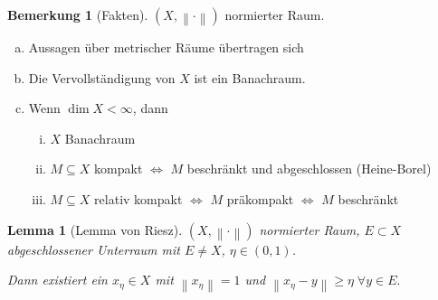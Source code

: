 \documentclass[ngerman]{report}
\theoremstyle{plain}%
\newtheorem{lemma}[thm]{Lemma}
\theoremstyle{definition}%
\theoremstyle{myStyle}
\newtheorem{bem}[thm]{Bemerkung}
\newcommand{\norm}[1]{\left \|#1\right\| }
\newcommand{\aq}{\Leftrightarrow} %
\begin{document}
	\begin{bem}[Fakten]
		$(X,\norm{\cdot})$ normierter Raum.
		\begin{enumerate}[a)]
			\item Aussagen über metrischer Räume übertragen sich
			\item Die Vervollständigung von $X$ ist ein Banachraum.
			\item Wenn $\dim X < \infty$, dann
				\begin{enumerate}[i)]
					\item $X$ Banachraum
					\item $M\subseteq X$ kompakt $\aq$ $M$ beschränkt und abgeschlossen (Heine-Borel)
					\item $M\subseteq X$ relativ kompakt $\aq$ $M$ präkompakt  $\aq$ $M$ beschränkt
				\end{enumerate}
		\end{enumerate}
	\end{bem}
\newcommand{\xt}{x_\eta}%

	\begin{lemma}[Lemma von Riesz]%
		$(X,\norm{\cdot})$ normierter Raum, $E\subset X$ abgeschlossener Unterraum mit $E \not = X$, $\eta\in (0,1)$. \par
		Dann existiert ein $x_\eta \in X$ mit $\norm{\xt} = 1$ und $\norm{\xt - y} \geq \eta \; \forall y\in E.$
	\end{lemma}
\end{document}
